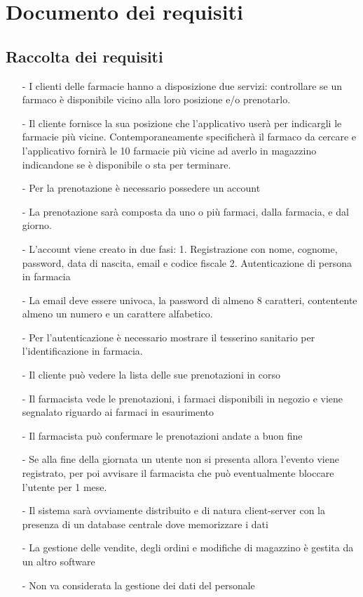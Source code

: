 \newpage
\section{Documento dei requisiti}
\subsection{Raccolta dei requisiti}
\begin{itemize}
    \item[-] I clienti delle farmacie hanno a disposizione due servizi: controllare se un farmaco è disponibile vicino alla loro posizione e/o prenotarlo.
    \item[-] Il cliente fornisce la sua posizione che l'applicativo userà per indicargli le farmacie più vicine. Contemporaneamente specificherà il farmaco da cercare e l'applicativo fornirà le 10 farmacie più vicine ad averlo in magazzino indicandone se è disponibile o sta per terminare.
    \item[-] Per la prenotazione è necessario possedere un account
    \item[-] La prenotazione sarà composta da uno o più farmaci, dalla farmacia, e dal giorno. 
    \item[-] L'account viene creato in due fasi:
        1. Registrazione con nome, cognome, password, data di nascita, email e codice fiscale
        2. Autenticazione di persona in farmacia
    \item[-] La email deve essere univoca, la password di almeno 8 caratteri, contentente almeno un numero e un carattere alfabetico.
    \item[-] Per l'autenticazione è necessario mostrare il tesserino sanitario per l'identificazione in farmacia.
    \item[-] Il cliente può vedere la lista delle sue prenotazioni in corso
    \item[-] Il farmacista vede le prenotazioni, i farmaci disponibili in negozio e viene segnalato riguardo ai farmaci in esaurimento
    \item[-] Il farmacista può confermare le prenotazioni andate a buon fine
    \item[-] Se alla fine della giornata un utente non si presenta allora l'evento viene registrato, per poi avvisare il farmacista che può eventualmente bloccare l'utente per 1 mese.
    \item[-] Il sistema sarà ovviamente distribuito e di natura client-server con la presenza di un database centrale dove memorizzare i dati
    \item[-] La gestione delle vendite, degli ordini e modifiche di magazzino è gestita da un altro software
    \item[-] Non va considerata la gestione dei dati del personale 
\end{itemize}
